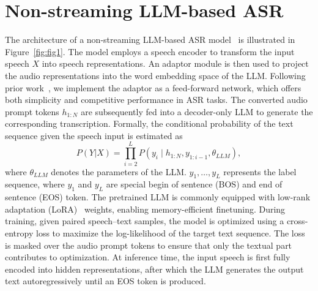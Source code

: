 \documentclass{article}
\begin{document}
\section{Non-streaming LLM-based ASR}


The architecture of a non-streaming LLM-based ASR model~\cite{fathullah2024prompting, ma2024embarrassingly} is illustrated in Figure~\ref{fig:fig1}.  
The model employs a speech encoder to transform the input speech $X$ into speech representations.  
An adaptor module is then used to project the audio representations into the word embedding space of the LLM.  
Following prior work~\cite{ma2024embarrassingly}, we implement the adaptor as a feed-forward network, which offers both simplicity and competitive performance in ASR tasks.  
The converted audio prompt tokens $h_{1:N}$ are subsequently fed into a decoder-only LLM to generate the corresponding transcription.  
Formally, the conditional probability of the text sequence given the speech input is estimated as
\begin{equation}
    P(Y | X) = \prod_{i=2}^{L} P(y_{i} \mid h_{1:N}, y_{1:i-1}, \theta_{LLM}),
\end{equation}
where $\theta_{LLM}$ denotes the parameters of the LLM.  $y_1, \dots, y_L$
represents the label sequence, where $y_1$ and $y_L$ are special begin of sentence (BOS) and
end of sentence (EOS) token.
The pretrained LLM is commonly equipped with low-rank adaptation (LoRA)~\cite{hu2022lora} weights, enabling memory-efficient finetuning.  
During training, given paired speech–text samples, the model is optimized using a cross-entropy loss to maximize the log-likelihood of the target text sequence.  
The loss is masked over the audio prompt tokens to ensure that only the textual part contributes to optimization.  
At inference time, the input speech is first fully encoded into hidden representations, after which the LLM generates the output text autoregressively until an EOS token is produced.
\end{document}
